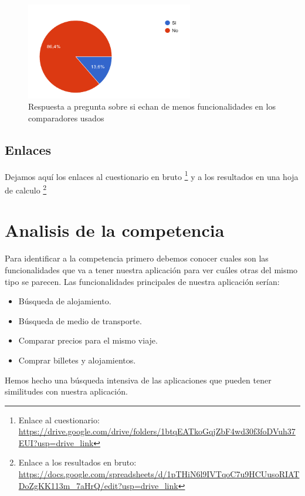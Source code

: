     
    \begin{figure}[H]
        \centering 
        \includegraphics[width=0.65\textwidth]{./Imagenes/Cuestionario/falta_funcionalidad.png}
        \caption{Respuesta a pregunta sobre si echan de menos funcionalidades en los comparadores usados}
        \label{fig:falta_funcionalidades}
    \end{figure}


\subsection{Enlaces}

Dejamos aquí los enlaces al cuestionario en bruto \footnote{Enlace al cuestionario: \url{https://drive.google.com/drive/folders/1btqEATkoGqjZbF4wd30f3foDVuh37EUI?usp=drive_link}} y a los resultados en una hoja de calculo \footnote{ Enlace a los resultados en bruto: \url{https://docs.google.com/spreadsheets/d/1pTHiN6l9IVTqoC7u9HCUusoRIATDoZgKK113m_7aHrQ/edit?usp=drive_link}}

\section{Analisis de la competencia}

Para identificar a la competencia primero debemos conocer cuales son las funcionalidades que va a tener nuestra aplicación para ver cuáles otras del mismo tipo se parecen. Las funcionalidades principales de nuestra aplicación serían:
\begin{itemize}
    \item Búsqueda de alojamiento.
    \item Búsqueda de medio de transporte.
    \item Comparar precios para el mismo viaje.
    \item Comprar billetes y alojamientos.
\end{itemize}

Hemos hecho una búsqueda intensiva de las aplicaciones que pueden tener similitudes con nuestra aplicación.

